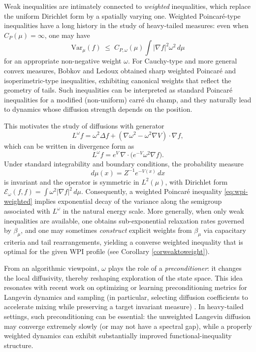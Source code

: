 \documentclass[11pt,reqno]{amsart}
\numberwithin{equation}{section}
\theoremstyle{definition}
\theoremstyle{remark}
\def \Var {\textrm{Var}}
\begin{document}
Weak inequalities are intimately connected to \emph{weighted} inequalities, which replace the uniform Dirichlet form by a spatially varying one. Weighted Poincar\'e-type inequalities have a long history in the study of heavy-tailed measures: even when $C_{ P}(\mu)=\infty$, one may have
\begin{equation}\label{eq:wpi-weighted}
\Var_\mu(f)\;\le\; C_{ P,\omega}(\mu)\int |\nabla f|^2\omega^2\,d\mu
\end{equation}
for an appropriate non-negative weight $\omega$. For Cauchy-type and more general convex measures, Bobkov and Ledoux \cite{BLweight} obtained sharp weighted Poincar\'e and isoperimetric-type inequalities, exhibiting canonical weights that reflect the geometry of tails. Such inequalities can be interpreted as standard Poincar\'e inequalities for a modified (non-uniform) carré du champ, and they naturally lead to dynamics whose diffusion strength depends on the position.

This motivates the study of diffusions with generator
\begin{equation}\label{eq:generator}
L^\omega f
=\omega^2 \Delta f +(\nabla\omega^2-\omega^2\nabla V)\cdot\nabla f,
\end{equation}
which can be written in divergence form as
\begin{equation}\label{eq:div}
L^\omega f = e^{V}\,\nabla\!\cdot\!\big(e^{-V}\omega^2\nabla f\big).
\end{equation}
Under standard integrability and boundary conditions, the probability measure
\begin{equation}\label{eq:inv}
d\mu(x) = Z^{-1}e^{-V(x)}\,dx
\end{equation}
is invariant and the operator is symmetric in $L^2(\mu)$, with Dirichlet form
$\mathcal{E}_\omega(f,f) = \int \omega^2|\nabla f|^2\,d\mu$.
Consequently, a weighted Poincar\'e inequality \eqref{eq:wpi-weighted} implies exponential decay of the variance along the semigroup associated with $L^\omega$ in the natural energy scale.
More generally, when only weak inequalities are available, one obtains sub-exponential relaxation rates governed by $\beta_\mu$, and one may sometimes \emph{construct} explicit weights from $\beta_\mu$ via capacitary criteria and tail rearrangements, yielding a converse weighted inequality that is optimal for the given WPI profile (see Corollary \ref{corweaktoweight}).

From an algorithmic viewpoint, $\omega$ plays the role of a \emph{preconditioner}: it changes the local diffusivity, thereby reshaping exploration of the state space. This idea resonates with recent work on optimizing or learning preconditioning metrics for Langevin dynamics and sampling (in particular, selecting diffusion coefficients to accelerate mixing while preserving a target invariant measure) \cite{cui2025optimalriemannianmetricpoincare,LelievrePavliotisRobinSantetStoltz2025OptimizingDiffusion}.
In heavy-tailed settings, such preconditioning can be essential: the unweighted Langevin diffusion may converge extremely slowly (or may not have a spectral gap), while a properly weighted dynamics can exhibit substantially improved functional-inequality structure.
\end{document}
